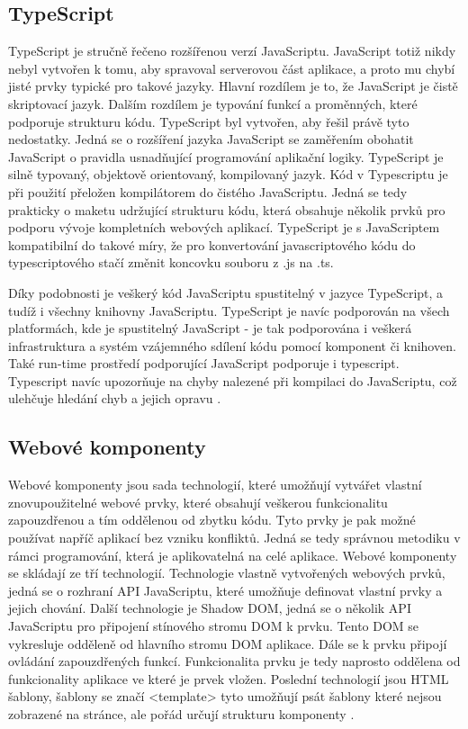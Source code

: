        \subsection{TypeScript}
TypeScript je stručně řečeno rozšířenou verzí JavaScriptu. JavaScript totiž nikdy nebyl vytvořen k tomu, aby spravoval serverovou část aplikace, a proto mu chybí jisté prvky typické pro takové jazyky. Hlavní rozdílem je to, že JavaScript je čistě skriptovací jazyk. Dalším rozdílem je typování funkcí a proměnných, které podporuje strukturu kódu. TypeScript byl vytvořen, aby řešil právě tyto nedostatky. Jedná se o rozšíření jazyka JavaScript se zaměřením obohatit JavaScript o pravidla usnadňující programování aplikační logiky. TypeScript je silně typovaný, objektově orientovaný, kompilovaný jazyk. Kód v Typescriptu je při použití přeložen kompilátorem do čistého JavaScriptu. Jedná se tedy prakticky o maketu udržující strukturu kódu, která obsahuje několik prvků pro podporu vývoje kompletních webových aplikací. TypeScript je s JavaScriptem kompatibilní do takové míry, že pro konvertování javascriptového kódu do typescriptového stačí změnit koncovku souboru z .js na .ts. 

Díky podobnosti je veškerý kód JavaScriptu spustitelný v jazyce TypeScript, a tudíž i všechny knihovny JavaScriptu. TypeScript je navíc podporován na všech platformách, kde je spustitelný JavaScript - je tak podporována i veškerá infrastruktura a systém vzájemného sdílení kódu pomocí komponent či knihoven. Také run-time prostředí podporující JavaScript podporuje i typescript. Typescript navíc upozorňuje na chyby nalezené při kompilaci do JavaScriptu, což ulehčuje hledání chyb a jejich opravu \cite{typescriptweb}.

        \subsection{Webové komponenty}
Webové komponenty jsou sada technologií, které umožňují vytvářet vlastní znovupoužitelné webové prvky, které obsahují veškerou funkcionalitu zapouzdřenou a tím oddělenou od zbytku kódu. Tyto prvky je pak možné používat napříč aplikací bez vzniku konfliktů. Jedná se tedy správnou metodiku v rámci programování, která je aplikovatelná na celé aplikace. Webové komponenty se skládají ze tří technologií. Technologie vlastně vytvořených webových prvků, jedná se o rozhraní API JavaScriptu, které umožňuje definovat vlastní prvky a jejich chování. Další technologie je Shadow DOM, jedná se o několik API JavaScriptu pro připojení stínového stromu DOM k prvku. Tento DOM se vykresluje odděleně od hlavního stromu DOM aplikace. Dále se k prvku připojí ovládání zapouzdřených funkcí. Funkcionalita prvku je tedy naprosto oddělena od funkcionality aplikace ve které je prvek vložen. Poslední technologií jsou HTML šablony, šablony se značí <template> tyto umožňují psát šablony které nejsou zobrazené na stránce, ale pořád určují strukturu komponenty \cite{webcomponentsaction}.